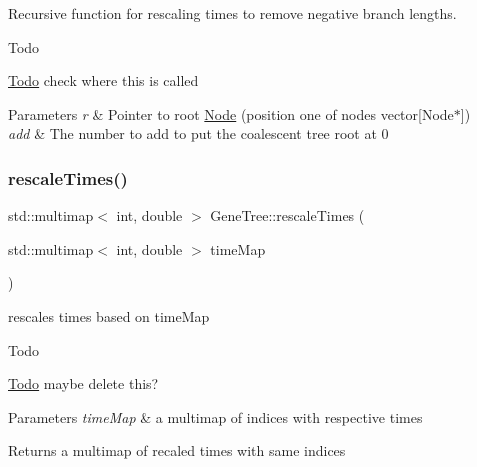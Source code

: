 Recursive function for rescaling times to remove negative branch lengths. 

\begin{DoxyRefDesc}{Todo}
\item[\mbox{\hyperlink{todo__todo000004}{Todo}}]check where this is called\end{DoxyRefDesc}



\begin{DoxyParams}{Parameters}
{\em r} & Pointer to root \mbox{\hyperlink{class_node}{Node}} (position one of nodes vector\mbox{[}Node$\ast$\mbox{]}) \\
\hline
{\em add} & The number to add to put the coalescent tree root at 0 \\
\hline
\end{DoxyParams}
\mbox{\label{class_gene_tree_a6549561e4582a7a28a6b68c895c302e7}} 
\subsubsection{\texorpdfstring{rescaleTimes()}{rescaleTimes()}}
{\footnotesize\ttfamily std\+::multimap$<$ int, double $>$ Gene\+Tree\+::rescale\+Times (\begin{DoxyParamCaption}\item[{std\+::multimap$<$ int, double $>$}]{time\+Map }\end{DoxyParamCaption})}



rescales times based on time\+Map 

\begin{DoxyRefDesc}{Todo}
\item[\mbox{\hyperlink{todo__todo000002}{Todo}}]maybe delete this? \end{DoxyRefDesc}

\begin{DoxyParams}{Parameters}
{\em time\+Map} & a multimap of indices with respective times \\
\hline
\end{DoxyParams}
\begin{DoxyReturn}{Returns}
a multimap of recaled times with same indices 
\end{DoxyReturn}
\mbox{\label{class_gene_tree_a0eac2f81800a4aa6734dd1d9ef329614}} 
